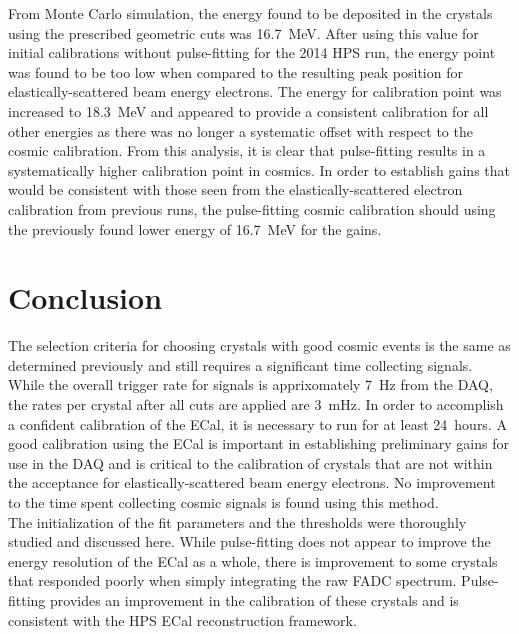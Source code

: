 \documentclass[twoside]{article}
\begin{document}
\indent From Monte Carlo simulation, the energy found to be deposited in the crystals using the prescribed geometric cuts was 16.7~MeV. After using this value for initial calibrations without pulse-fitting for the 2014 HPS run, the energy point was found to be too low when compared to the resulting peak position for elastically-scattered beam energy electrons. The energy for calibration point was increased to 18.3~MeV and appeared to provide a consistent calibration for all other energies as there was no longer a systematic offset with respect to the cosmic calibration. From this analysis, it is clear that pulse-fitting results in a systematically higher calibration point in cosmics. In order to establish gains that would be consistent with those seen from the elastically-scattered electron calibration from previous runs, the pulse-fitting cosmic calibration should using the previously found lower energy of 16.7~MeV for the gains. 


\section{Conclusion}
The selection criteria for choosing crystals with good cosmic events is the same as determined previously and still requires a significant time collecting signals. While the overall trigger rate for signals is apprixomately 7~Hz from the DAQ, the rates per crystal after all cuts are applied are 3~mHz. In order to accomplish a confident calibration of the ECal, it is necessary to run for at least 24~hours. A good calibration using the ECal is important in establishing preliminary gains for use in the DAQ and is critical to the calibration of crystals that are not within the acceptance for elastically-scattered beam energy electrons. No improvement to the time spent collecting cosmic signals is found using this method.\\
\indent The initialization of the fit parameters and the thresholds were thoroughly studied and discussed here. While pulse-fitting does not appear to improve the energy resolution of the ECal as a whole, there is improvement to some crystals that responded poorly when simply integrating the raw FADC spectrum. Pulse-fitting provides an improvement in the calibration of these crystals and is consistent with the HPS ECal reconstruction framework.\\
\end{document}

